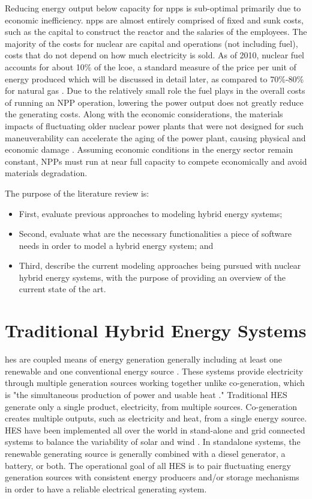 \documentclass[12pt]{UIdahoMastersThesis}
\begin{document}
Reducing energy output below capacity for \ac{npps} is sub-optimal primarily due to economic inefficiency\cite{Nuclear2011}. \ac{npps} are almost entirely comprised of fixed and sunk costs, such as the capital to construct the reactor and the salaries of the employees. The majority of the costs for nuclear are capital and operations (not including fuel), costs that do not depend on how much electricity is sold. As of 2010, nuclear fuel accounts for about 10\% of the \ac{lcoe}, a standard measure of the price per unit of energy produced which will be discussed in detail later, as compared to 70\%-80\% for natural gas \cite{IEA/NEA}. Due to the relatively small role the fuel plays in the overall costs of running an NPP operation, lowering the power output does not greatly reduce the generating costs. Along with the economic considerations, the materials impacts  of fluctuating older nuclear power plants that were not designed for such maneuverability can accelerate the aging of the power plant, causing physical and economic damage \cite{Nuclear2011}. Assuming economic conditions in the energy sector remain constant, NPPs must run at near full capacity to compete economically and avoid materials degradation.

The purpose of the literature review is:
\begin{itemize}
\item First, evaluate previous approaches to modeling hybrid energy systems;
\item Second, evaluate what are the necessary functionalities a piece of software needs in order to model a hybrid energy system; and
\item Third, describe the current modeling approaches being pursued with nuclear hybrid energy systems, with the purpose of providing an overview of the current state of the art.
\end{itemize}


\section{Traditional Hybrid Energy Systems}
\ac{hes} are coupled means of energy generation generally including at least one renewable and one conventional energy source \cite {Ibrahim2011}. These systems provide electricity through multiple generation sources working together unlike co-generation, which is "the simultaneous production of power and usable heat \cite{Rosen2005}." Traditional HES generate only a single product, electricity, from multiple sources. Co-generation creates multiple outputs, such as electricity and heat, from a single energy source. HES have been implemented all over the world in stand-alone and grid connected systems to balance the variability of solar and wind \cite {Garcia2015, Qi2014, Shin2015, Nixon2012, Adaramola2014, Goodbody2013, BorgesNeto2010, McGowan1996}. In standalone systems, the renewable generating source is generally combined with a diesel generator, a battery, or both. The operational goal of all HES is to pair fluctuating energy generation sources with consistent energy producers and/or storage mechanisms in order to have a reliable electrical generating system.
\end{document}
